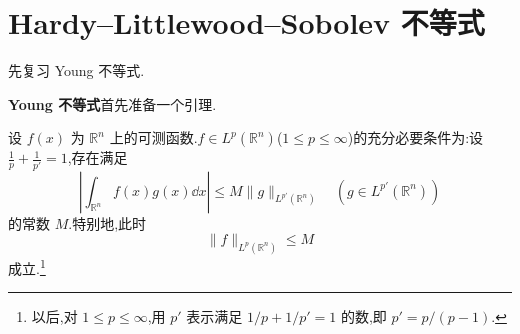 \section{Hardy--Littlewood--Sobolev 不等式}\label{sec:4.2}


先复习 Young 不等式.

\noindent\textbf{Young 不等式}\quad 首先准备一个引理.

\begin{lemma}\label{lem:4.2.1}
设 $f(x)$ 为 $\mathbb{R}^{n}$ 上的可测函数.$f \in L^{p}(\mathbb{R}^{n})$($1 \leq p \leq \infty$)的充分必要条件为:设 $\frac{1}{p} + \frac{1}{p'} = 1$,存在满足
\begin{equation*}
\left|\int_{\mathbb{R}^{n}}f(x)g(x)\dd x\right| \leq M\|g\|_{L^{p'}(\mathbb{R}^{n})} \quad (g \in L^{p'}(\mathbb{R}^{n}))
\end{equation*}
的常数 $M$.特别地,此时
\begin{equation*}
\|f\|_{L^{p}(\mathbb{R}^{n})} \leq M
\end{equation*}
成立.\footnote{以后,对 $1 \leq p \leq \infty$,用 $p'$ 表示满足 $1/p + 1/p' = 1$ 的数,即 $p' = p/(p-1)$.}
\end{lemma}

